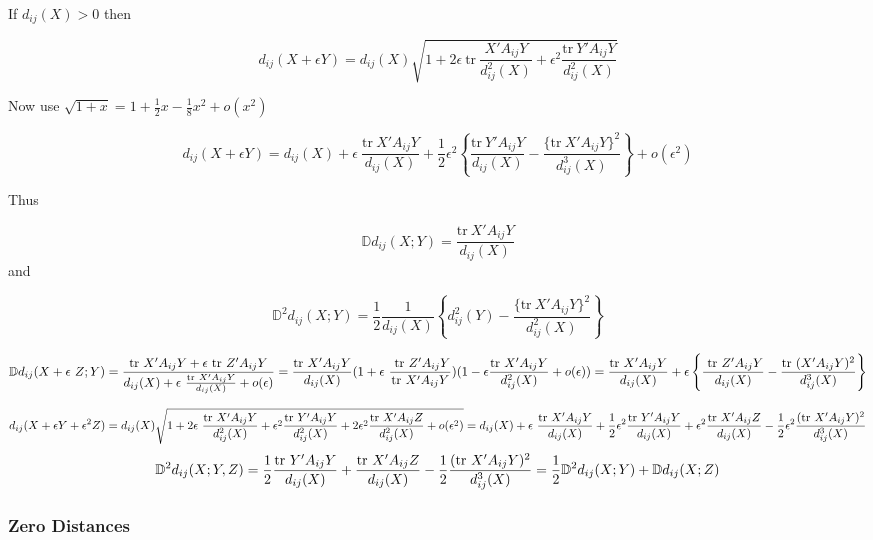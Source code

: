\documentclass[
  12pt,
]{book}
\theoremstyle{definition}
\theoremstyle{definition}
\theoremstyle{definition}
\theoremstyle{definition}
\theoremstyle{remark}
\begin{document}
If \(d_{ij}(X)>0\) then

\[
d_{ij}(X+\epsilon Y)=d_{ij}(X)\sqrt{1+2\epsilon\ \text{tr}\ \frac{X'A_{ij}Y}{d_{ij}^2(X)}+\epsilon^2\frac{\text{tr}\ Y'A_{ij}Y}{d_{ij}^2(X)}}
\]

Now use \(\sqrt{1+x}=1+\frac12 x-\frac18x^2 + o(x^2)\)

\[
d_{ij}(X+\epsilon Y)=
d_{ij}(X)+\epsilon\ \frac{\text{tr}\ X'A_{ij}Y}{d_{ij}(X)}
+\frac12\epsilon^2\left\{\frac{\text{tr}\ Y'A_{ij}Y}{d_{ij}(X)}
-\frac{\{\text{tr}\ X'A_{ij}Y\}^2}{d_{ij}^3(X)}\right\}+o(\epsilon^2)
\]

Thus

\[
\mathbb{D}d_{ij}(X;Y)=\frac{\text{tr}\ X'A_{ij}Y}{d_{ij}(X)}
\]
and

\[
\mathbb{D}^2d_{ij}(X;Y)=\frac12\frac{1}{d_{ij}(X)}\left\{ d_{ij}^2(Y)
-\frac{\{\text{tr}\ X'A_{ij}Y\}^2}{d_{ij}^2(X)}\right\}
\]

\[
\mathbb{D}d_{ij}(X+\epsilon\ Z;Y)=\frac{\text{tr}\ X'A_{ij}Y+\epsilon\  \text{tr}\ Z'A_{ij}Y}{d_{ij}(X)+\epsilon\ \frac{\text{tr}\ X'A_{ij}Y}{d_{ij}(X)}+o(\epsilon)}=\\
\frac{\text{tr}\ X'A_{ij}Y}{d_{ij}(X)}(1+\epsilon\ \frac{\  \text{tr}\ Z'A_{ij}Y}{\text{tr}\ X'A_{ij}Y})(1-\epsilon\frac{\text{tr}\ X'A_{ij}Y}{d_{ij}^2(X)}+o(\epsilon))=\\
\frac{\text{tr}\ X'A_{ij}Y}{d_{ij}(X)}+\epsilon\left\{\frac{\  \text{tr}\ Z'A_{ij}Y}{d_{ij}(X)}-\frac{\text{tr}\ (X'A_{ij}Y)^2}{d_{ij}^3(X)}\right\}
\]

\[
d_{ij}(X+\epsilon Y+\epsilon^2 Z)=\\
d_{ij}(X)\sqrt{1+2\epsilon\ \frac{\text{tr}\ X'A_{ij}Y}{d_{ij}^2(X)}+\epsilon^2\frac{\text{tr}\ Y'A_{ij}Y}{d_{ij}^2(X)}+2\epsilon^2\frac{\text{tr}\  X'A_{ij}Z}{d_{ij}^2(X)}+o(\epsilon^2)}=\\
d_{ij}(X)+\epsilon\ \frac{\text{tr}\ X'A_{ij}Y}{d_{ij}(X)}+\frac12\epsilon^2\frac{\text{tr}\ Y'A_{ij}Y}{d_{ij}(X)}+\epsilon^2\frac{\text{tr}\  X'A_{ij}Z}{d_{ij}(X)}-\frac12\epsilon^2\frac{(\text{tr}\ X'A_{ij}Y)^2}{d_{ij}^3(X)}\\
\]
\[
\mathbb{D}^2d_{ij}(X;Y,Z)=\frac12\frac{\text{tr}\ Y'A_{ij}Y}{d_{ij}(X)}+\frac{\text{tr}\  X'A_{ij}Z}{d_{ij}(X)}-\frac12\frac{(\text{tr}\ X'A_{ij}Y)^2}{d_{ij}^3(X)}=\\
\frac12\mathbb{D}^2d_{ij}(X;Y)+\mathbb{D}d_{ij}(X;Z)
\]

\hypertarget{zero-distances}{%
\subsubsection{Zero Distances}\label{zero-distances}}
\end{document}
